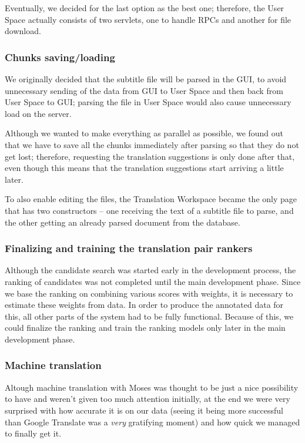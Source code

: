 Eventually, we decided for the last option as the best one; therefore, the User Space actually consists of two servlets, one to handle RPCs and another for file download.

\subsubsection{Chunks saving/loading}

We originally decided that the subtitle file will be parsed in the GUI, 
to avoid unnecessary sending of the data from GUI to User Space and then back from User Space to GUI; parsing the file in User Space would also cause unnecessary load on the server.

Although we wanted to make everything as parallel as possible, we found out that we have to save all the chunks immediately after parsing so that they do not get lost; therefore, requesting the translation suggestions is only done after that, even though this means that the translation suggestions start arriving a little later.

To also enable editing the files, the Translation Workspace became the only page that has two constructors -- one receiving the text of a subtitle file to parse, and the other getting an already parsed document from the database.

\subsubsection{Finalizing and training the translation pair rankers}

Although the candidate search was started early in the development process, the ranking of candidates was not completed until the main development phase. Since we base the ranking on combining various scores with weights, it is necessary to estimate these weights from data. In order to produce the annotated data for this, all other parts of the system had to be fully functional. Because of this, we could finalize the ranking and train the ranking models only later in the main development phase.

\subsubsection{Machine translation}
Altough machine translation with Moses was thought to be just a nice possibility to have and weren't given too much attention initially, at the end we were very surprised with how accurate it is on our data (seeing it being more successful than Google Translate was a \emph{very} gratifying moment) and how quick we managed to finally get it.

